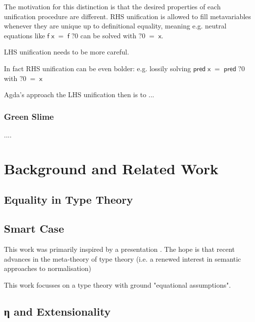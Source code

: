 \documentclass[
    a4paper, %
    fontsize=11pt, %
    twoside=false, %
	numbers=noenddot, %
	fontmethod=tex, %
]{kaobook}
\newcommand{\Varid}[1]{\mathit{#1}}
\renewcommand\Varid[1]{\mathord{\textsf{#1}}}
\begin{document}
The motivation for this distinction is that the desired properties of each
unification procedure are different. RHS unification is allowed to fill
metavariables whenever they are unique up to definitional equality, meaning
e.g. neutral equations like \ensuremath{\Varid{f}\;\Varid{x}\;\mathrel{=}\;\Varid{f}\;\Varid{?0}} can be solved with \ensuremath{\Varid{?0}\;\mathrel{=}\;\Varid{x}}.

LHS unification needs to be more careful.

In fact RHS unification can be even bolder: e.g. lossily solving 
\ensuremath{\Varid{pred}\;\Varid{x}\;\mathrel{=}\;\Varid{pred}\;\Varid{?0}} with \ensuremath{\Varid{?0}\;\mathrel{=}\;\Varid{x}}

Agda's approach the LHS unification then is to ...

\subsection{Green Slime}

....









\chapter{Background and Related Work}

\section{Equality in Type Theory}



\section{Smart Case}

This work was primarily inspired by a presentation 
. The hope is that 
recent advances in the meta-theory of type theory (i.e. a renewed interest in 
semantic approaches to normalisation)

This work focusses on a type theory with ground "equational assumptions".

\section{η and Extensionality}
\end{document}
